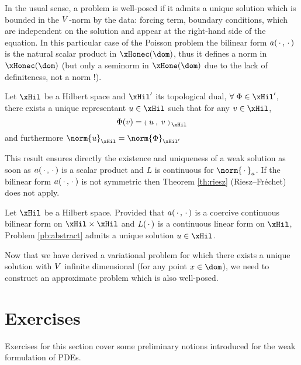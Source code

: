 In the usual sense, a problem is well-posed if it admits a unique solution which is bounded in the ${V}$-norm by the data: forcing term, boundary conditions, which are independent on the solution and appear at the right-hand side of the equation.
In this particular case of the Poisson problem the bilinear form $a(\,{\mathbf\cdot}\,,\,{\mathbf\cdot}\,)$ is the natural scalar product in $\xHonec(\dom)$, thus it defines a norm in $\xHonec(\dom)$ (but only a seminorm in $\xHone(\dom)$ due to the lack of definiteness, not a norm !).

\begin{thrm}\label{th:riesz}
Let $\xHil$ be a Hilbert space and $\xHil'$ its topological dual, $\forany  \Phi \in \xHil'$, there exists a unique representant $u \in \xHil$ such that for any $v\in\xHil$,
\begin{equation*}
\Phi(v) = \InnerP{u}{v}{\xHil}
\end{equation*}
and furthermore $\norm{u}_\xHil = \norm{\Phi}_{\xHil'}$
\end{thrm}

This result ensures directly the existence and uniqueness of a weak solution as soon as $a(\,{\mathbf\cdot}\,,\,{\mathbf\cdot}\,)$ is a scalar product and $L$ is continuous for $\norm{\xDot}_a$.
If the bilinear form $a(\,{\mathbf\cdot}\,,\,{\mathbf\cdot}\,)$ is not symmetric then Theorem \ref{th:riesz} (Riesz--Fréchet) does not apply.

\begin{thrm}
Let $\xHil$ be a Hilbert space.
Provided that $a(\,{\mathbf\cdot}\,,\,{\mathbf\cdot}\,)$ is a coercive continuous bilinear form on $\xHil\times\xHil$ and $L(\,{\mathbf\cdot}\,)$ is a continuous linear form on $\xHil$, Problem \eqref{pb:abstract} admits a unique solution $u \in \xHil$.
\end{thrm}

Now that we have derived a variational problem for which there exists a unique solution with ${V}$ infinite dimensional (\ie for any point $x\in\dom$), we need to construct an approximate problem which is also well-posed.

\newpage

\section{Exercises}

Exercises for this section cover some preliminary notions introduced for the weak formulation of PDEs.

